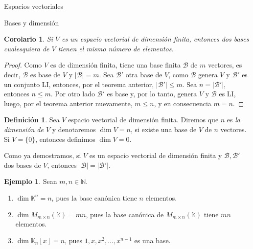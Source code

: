 \documentclass[a4paper,12pt,twoside,spanish]{amsbook}
\newtheorem{corolario}[teorema]{Corolario}
\theoremstyle{definition}
\newtheorem{definicion}{Definici\'on}[section]
\newtheorem{ejemplo}{Ejemplo}[section]
\theoremstyle{remark}
\newcommand{\K}{\mathbb K}
\begin{document}
\begin{chapter}{Espacios vectoriales}
\begin{section}{Bases y dimensión}
\begin{corolario}
	Si $V$ es un espacio vectorial de dimensión finita, entonces dos bases cualesquiera de $V$ tienen el mismo número de elementos.
\end{corolario}
\begin{proof}
		Como $V$ es de dimensión finita, tiene una base finita $\mathcal B$  de $m$ vectores, es decir,  $\mathcal B$ es base de $V$ y  $|\mathcal B| = m.$
		Sea $\mathcal B'$  otra base de $V$, como $\mathcal B$  genera $V$ y  $\mathcal B'$ es  un conjunto LI, entonces, por el teorema anterior, $|\mathcal B'| \le m$. Sea $n = |\mathcal B'|$,  entonces $n \le m$. Por otro lado $\mathcal B'$ es base y, por lo tanto,  genera $V$ y  $\mathcal B$ es LI, luego, por el teorema anterior nuevamente,  $m \le n$, y en consecuencia $m=n$.
\end{proof}

\begin{definicion}
	Sea $V$ espacio vectorial de dimensión finita. Diremos que $n$  es \textit{la dimensión de $V$} y  denotaremos $\dim V =n$,  si existe una base de $V$  de $n$  vectores. Si $V = \{0\}$,  entonces definimos $\dim V =0$.
\end{definicion}


Como ya demostramos, si $V$  es un espacio vectorial de dimensión finita y $\mathcal B,\mathcal B' $ dos bases de $V$,  entonces $|\mathcal B|=|\mathcal B'|$.



\begin{ejemplo} Sean $m,n \in \mathbb N$. 
	\begin{enumerate}
		\item $\dim \K^n= n$, pues  la base canónica tiene $n$ elementos.
		\item $\dim M_{m \times n}(\K) = mn$, pues la base canónica de $M_{m \times n}(\K)$ tiene $mn$  elementos.  
		\item $\dim \K_n[x] =n$, pues $1,x,x^2,\ldots,x^{n-1}$ es una base.   
	\end{enumerate}
\end{ejemplo}
		

\end{section}
\end{chapter}
\end{document}
